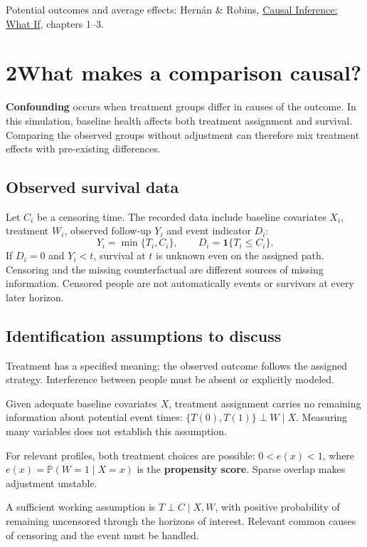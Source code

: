 \documentclass[11pt,letterpaper]{article}
\newcommand{\Prb}{\mathbb{P}}
\newcommand{\ind}{\mathbf{1}}
\newcommand{\term}[1]{\textbf{\color{ink}#1}}
\newcommand{\source}[1]{{\small\color{muted}#1}}
\begin{document}
\source{Potential outcomes and average effects:
Hern\'an \& Robins, \href{https://miguelhernan.org/whatifbook}{Causal Inference: What If}, chapters 1--3.}

\newpage
\section{2\enspace What makes a comparison causal?}
\term{Confounding} occurs when treatment groups differ in causes of the
outcome. In this simulation, baseline health affects both treatment assignment
and survival. Comparing the observed groups without adjustment can therefore
mix treatment effects with pre-existing differences.

\subsection{Observed survival data}
Let $C_i$ be a censoring time. The recorded data include baseline covariates
$X_i$, treatment $W_i$, observed follow-up $Y_i$ and event indicator $D_i$:
\[
 Y_i=\min\{T_i,C_i\},\qquad D_i=\ind\{T_i\le C_i\}.
\]
If $D_i=0$ and $Y_i<t$, survival at $t$ is unknown even on the assigned path.
Censoring and the missing counterfactual are different sources of missing
information. Censored people are not automatically events or survivors at
every later horizon.

\subsection{Identification assumptions to discuss}
\begin{description}[leftmargin=0pt,labelsep=0pt,itemsep=8pt,style=nextline]
\item[\term{Well-defined strategies and consistency}]
Treatment has a specified meaning; the observed outcome follows the assigned
strategy. Interference between people must be absent or explicitly modeled.
\item[\term{Conditional exchangeability}]
Given adequate baseline covariates $X$, treatment assignment carries no
remaining information about potential event times:
$\{T(0),T(1)\}\perp W\mid X$.
Measuring many variables does not establish this assumption.
\item[\term{Treatment positivity / overlap}]
For relevant profiles, both treatment choices are possible:
$0<e(x)<1$, where $e(x)=\Prb(W=1\mid X=x)$ is the
\term{propensity score}. Sparse overlap makes adjustment unstable.
\item[\term{Censoring assumptions and follow-up support}]
A sufficient working assumption is $T\perp C\mid X,W$, with positive
probability of remaining uncensored through the horizons of interest.
Relevant common causes of censoring and the event must be handled.
\end{description}
\end{document}
